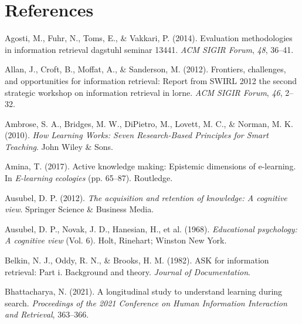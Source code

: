 \documentclass[letterpaper, nobind]{templates/ociamthesis}
\newlength{\cslhangindent}
\newenvironment{CSLReferences}[2] %
 {%
  \setlength{\parindent}{0pt}
  \ifodd #1
  \let\oldpar\par
  \def\par{\hangindent=\cslhangindent\oldpar}
  \fi
  \setlength{\parskip}{1mm}
  \setlength{\baselineskip}{6mm}
 }%
 {}
\begin{document}
\hypertarget{references}{%
\chapter*{References}\label{references}}


\hypertarget{refs}{}
\begin{CSLReferences}{1}{0}
\leavevmode{}%
Agosti, M., Fuhr, N., Toms, E., \& Vakkari, P. (2014). Evaluation methodologies in information retrieval dagstuhl seminar 13441. \emph{ACM SIGIR Forum}, \emph{48}, 36--41.

\leavevmode{}%
Allan, J., Croft, B., Moffat, A., \& Sanderson, M. (2012). Frontiers, challenges, and opportunities for information retrieval: Report from SWIRL 2012 the second strategic workshop on information retrieval in lorne. \emph{ACM SIGIR Forum}, \emph{46}, 2--32.

\leavevmode{}%
Ambrose, S. A., Bridges, M. W., DiPietro, M., Lovett, M. C., \& Norman, M. K. (2010). \emph{How {Learning Works}: Seven {Research}-{Based Principles} for {Smart Teaching}}. {John Wiley \& Sons}.

\leavevmode{}%
Amina, T. (2017). Active knowledge making: Epistemic dimensions of e-learning. In \emph{E-learning ecologies} (pp. 65--87). Routledge.

\leavevmode{}%
Ausubel, D. P. (2012). \emph{The acquisition and retention of knowledge: A cognitive view}. Springer Science \& Business Media.

\leavevmode{}%
Ausubel, D. P., Novak, J. D., Hanesian, H., et al. (1968). \emph{Educational psychology: A cognitive view} (Vol. 6). Holt, Rinehart; Winston New York.

\leavevmode{}%
Belkin, N. J., Oddy, R. N., \& Brooks, H. M. (1982). ASK for information retrieval: Part i. Background and theory. \emph{Journal of Documentation}.

\leavevmode{}%
Bhattacharya, N. (2021). A longitudinal study to understand learning during search. \emph{Proceedings of the 2021 Conference on Human Information Interaction and Retrieval}, 363--366.


\end{CSLReferences}
\end{document}
